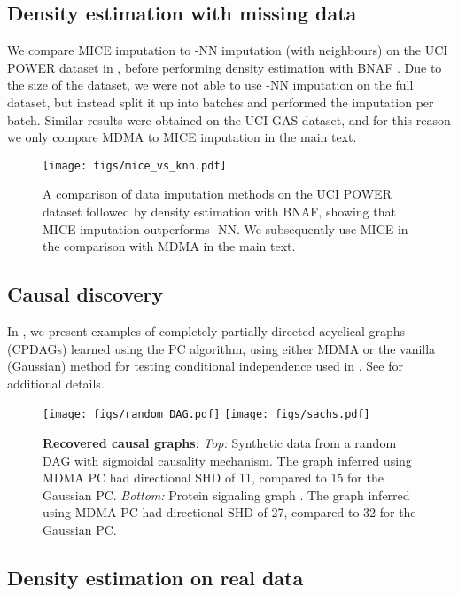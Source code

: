 \documentclass{article}
\begin{document}
\subsection{Density estimation with missing data}

We compare MICE imputation \cite{buuren2010mice} to -NN imputation (with  neighbours) \cite{troyanskaya2001missing} on the UCI POWER dataset in , before performing density estimation with BNAF \cite{de2020block}. Due to the size of the dataset, we were not able to use -NN imputation on the full 
dataset, but instead split it up into  batches and performed the imputation per batch. Similar results were obtained on the UCI GAS dataset, and for this reason we only compare MDMA to MICE imputation in the main text.
\begin{figure}
    \centering
    \texttt{[image: figs/mice\_vs\_knn.pdf]}
    \caption{A comparison of data imputation methods on the UCI POWER dataset followed by density estimation with BNAF, showing that MICE imputation outperforms -NN. We subsequently use MICE in the comparison with MDMA in the main text.}
    \label{fig:mice_vs_knn}
\end{figure}

\subsection{Causal discovery}

In , we present examples of completely partially directed acyclical graphs (CPDAGs) learned using the PC algorithm, using either MDMA or the vanilla (Gaussian) method for testing conditional independence used in \cite{petersen2021testing}. See  for additional details. 

\begin{figure}
    \centering
    \texttt{[image: figs/random\_DAG.pdf]}
    \texttt{[image: figs/sachs.pdf]}
    \caption{\textbf{Recovered causal graphs}: \textit{Top:} Synthetic data from a random DAG with sigmoidal causality mechanism. The graph inferred using MDMA PC had directional SHD of 11, compared to 15 for the Gaussian PC. \textit{Bottom:} Protein signaling graph \cite{sachs2005causal}. The graph inferred using MDMA PC had directional SHD of 27, compared to 32 for the Gaussian PC.}
    \label{fig:cd_graphs}
\end{figure}

\subsection{Density estimation on real data}
\end{document}
